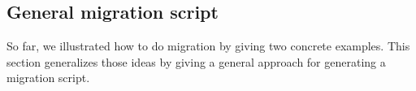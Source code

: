 \documentclass[runningheads]{llncs}
\begin{document}

\subsection{General migration script}
   So far, we illustrated how to do migration by giving two concrete examples.
   This section generalizes those ideas by giving a general approach for generating a migration script.
   
\end{document}
